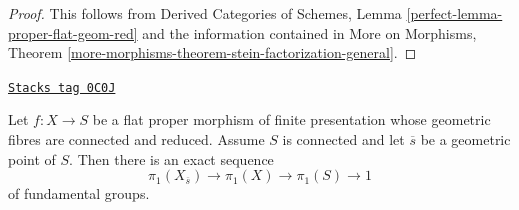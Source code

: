 \begin{proof}
This follows from Derived Categories of Schemes,
Lemma \ref{perfect-lemma-proper-flat-geom-red}
and the information contained in
More on Morphisms, Theorem
\ref{more-morphisms-theorem-stein-factorization-general}.
\end{proof}

\begin{proposition}
\label{pione-proposition-first-homotopy-sequence}
\href{https://stacks.math.columbia.edu/tag/0C0J}{\texttt{Stacks tag 0C0J}}

Let $f : X \to S$ be a flat proper morphism of finite presentation whose
geometric fibres are connected and reduced. Assume $S$ is connected and
let $\overline{s}$ be a geometric point of $S$. Then there is an exact
sequence
$$
\pi_1(X_{\overline{s}}) \to \pi_1(X) \to \pi_1(S) \to 1
$$
of fundamental groups.
\end{proposition}

